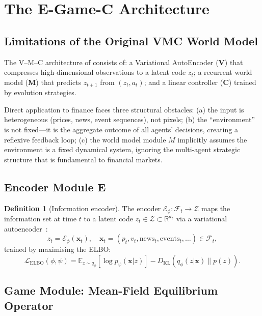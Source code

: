 \documentclass[12pt,a4paper]{article}
\theoremstyle{plain}
\theoremstyle{definition}
\newtheorem{definition}[theorem]{Definition}
\newcommand{\R}{\mathbb{R}}
\newcommand{\E}{\mathbb{E}}
\newcommand{\F}{\mathcal{F}}
\newcommand{\Z}{\mathcal{Z}}
\newcommand{\1}{\mathbbm{1}}
\newcommand{\KL}[2]{D_{\mathrm{KL}}(#1 \| #2)}
\begin{document}
\section{The E-Game-C Architecture}
\label{sec:egc}

\subsection{Limitations of the Original VMC World Model}

The V--M--C architecture of \citet{HaSchmidhuber2018} consists of:
a Variational AutoEncoder (\textbf{V}) that compresses high-dimensional
observations to a latent code $z_t$;
a recurrent world model (\textbf{M}) that predicts $z_{t+1}$ from $(z_t, a_t)$;
and a linear controller (\textbf{C}) trained by evolution strategies.

Direct application to finance faces three structural obstacles:
(a) the input is heterogeneous (prices, news, event sequences), not pixels;
(b) the ``environment'' is not fixed—it is the aggregate outcome of all
agents' decisions, creating a reflexive feedback loop;
(c) the world model module $M$ implicitly assumes the environment is a
fixed dynamical system, ignoring the multi-agent strategic structure
that is fundamental to financial markets.

\subsection{Encoder Module E}

\begin{definition}[Information encoder]
\label{def:encoder}
The encoder $\mathcal{E}_\phi: \F_t \to \Z$ maps the information set at time
$t$ to a latent code $z_t \in \Z \subset \R^{d_z}$ via a
variational autoencoder~\citep{KingmaWelling2014}:
\[
z_t = \mathcal{E}_\phi(\mathbf{x}_t), \quad
\mathbf{x}_t = (p_t, v_t, \text{news}_t, \text{events}_t, \ldots) \in \F_t,
\]
trained by maximising the ELBO:
\[
\mathcal{L}_{\mathrm{ELBO}}(\phi,\psi)
= \E_{z \sim q_\phi}[\log p_\psi(\mathbf{x}|z)]
  - \KL{q_\phi(z|\mathbf{x})}{p(z)}.
\]
\end{definition}

\subsection{Game Module: Mean-Field Equilibrium Operator}
\end{document}
